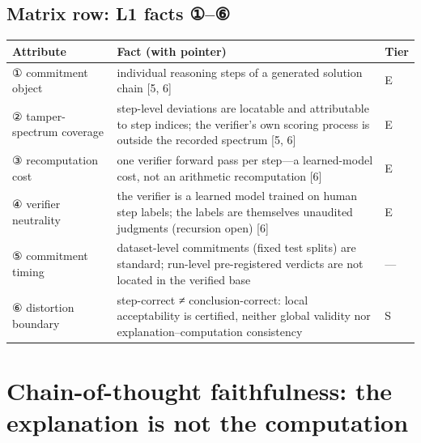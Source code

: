 \documentclass[11pt]{article}
\begin{document}
\subsection{Matrix row: L1 facts ①–⑥}
\begingroup\footnotesize
\noindent\begin{tabularx}{\textwidth}{@{}>{\raggedright\arraybackslash}p{} >{\raggedright\arraybackslash}X >{\raggedright\arraybackslash}p{}@{}}
\toprule
\textbf{\textbf{Attribute}} & \textbf{\textbf{Fact (with pointer)}} & \textbf{\textbf{Tier}} \\
\midrule
① commitment object & individual reasoning steps of a generated solution chain [5, 6] & E \\
② tamper-spectrum coverage & step-level deviations are locatable and attributable to step indices; the verifier's own scoring process is outside the recorded spectrum [5, 6] & E \\
③ recomputation cost & one verifier forward pass per step—a learned-model cost, not an arithmetic recomputation [6] & E \\
④ verifier neutrality & the verifier is a learned model trained on human step labels; the labels are themselves unaudited judgments (recursion open) [6] & E \\
⑤ commitment timing & dataset-level commitments (fixed test splits) are standard; run-level pre-registered verdicts are not located in the verified base & — \\
⑥ distortion boundary & step-correct ≠ conclusion-correct: local acceptability is certified, neither global validity nor explanation–computation consistency & S \\
\bottomrule
\end{tabularx}
\endgroup
\section{Chain-of-thought faithfulness: the explanation is not the computation}
\label{sec:5}
\end{document}

